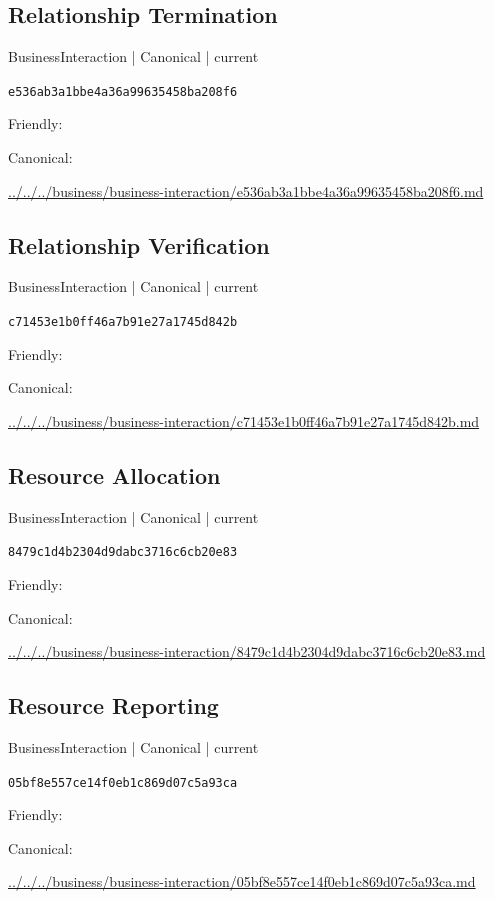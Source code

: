 \documentclass[10pt,a4paper]{article}
\begin{document}
\subsection*{Relationship Termination}
{\small BusinessInteraction | Canonical | current}\par
\texttt{e536ab3a1bbe4a36a99635458ba208f6}\par
Friendly: \par
Canonical: \par
{\footnotesize\url{../../../business/business-interaction/e536ab3a1bbe4a36a99635458ba208f6.md}}\par
\subsection*{Relationship Verification}
{\small BusinessInteraction | Canonical | current}\par
\texttt{c71453e1b0ff46a7b91e27a1745d842b}\par
Friendly: \par
Canonical: \par
{\footnotesize\url{../../../business/business-interaction/c71453e1b0ff46a7b91e27a1745d842b.md}}\par
\subsection*{Resource Allocation}
{\small BusinessInteraction | Canonical | current}\par
\texttt{8479c1d4b2304d9dabc3716c6cb20e83}\par
Friendly: \par
Canonical: \par
{\footnotesize\url{../../../business/business-interaction/8479c1d4b2304d9dabc3716c6cb20e83.md}}\par
\subsection*{Resource Reporting}
{\small BusinessInteraction | Canonical | current}\par
\texttt{05bf8e557ce14f0eb1c869d07c5a93ca}\par
Friendly: \par
Canonical: \par
{\footnotesize\url{../../../business/business-interaction/05bf8e557ce14f0eb1c869d07c5a93ca.md}}\par
\end{document}
